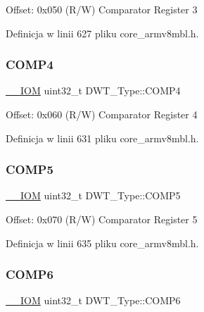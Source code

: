Offset\+: 0x050 (R/W) Comparator Register 3 

Definicja w linii 627 pliku core\+\_\+armv8mbl.\+h.

\mbox{\label{struct_d_w_t___type_a86bc7f4ad425a05b29978a6f97563783}} 
\subsubsection{\texorpdfstring{C\+O\+M\+P4}{COMP4}}
{\footnotesize\ttfamily \hyperlink{core__sc300_8h_ab6caba5853a60a17e8e04499b52bf691}{\+\_\+\+\_\+\+I\+OM} uint32\+\_\+t D\+W\+T\+\_\+\+Type\+::\+C\+O\+M\+P4}

Offset\+: 0x060 (R/W) Comparator Register 4 

Definicja w linii 631 pliku core\+\_\+armv8mbl.\+h.

\mbox{\label{struct_d_w_t___type_a07667ec9dd833ecab52bf2cf802d9acb}} 
\subsubsection{\texorpdfstring{C\+O\+M\+P5}{COMP5}}
{\footnotesize\ttfamily \hyperlink{core__sc300_8h_ab6caba5853a60a17e8e04499b52bf691}{\+\_\+\+\_\+\+I\+OM} uint32\+\_\+t D\+W\+T\+\_\+\+Type\+::\+C\+O\+M\+P5}

Offset\+: 0x070 (R/W) Comparator Register 5 

Definicja w linii 635 pliku core\+\_\+armv8mbl.\+h.

\mbox{\label{struct_d_w_t___type_a1256ac92acb94add255ff31aca31070d}} 
\subsubsection{\texorpdfstring{C\+O\+M\+P6}{COMP6}}
{\footnotesize\ttfamily \hyperlink{core__sc300_8h_ab6caba5853a60a17e8e04499b52bf691}{\+\_\+\+\_\+\+I\+OM} uint32\+\_\+t D\+W\+T\+\_\+\+Type\+::\+C\+O\+M\+P6}

